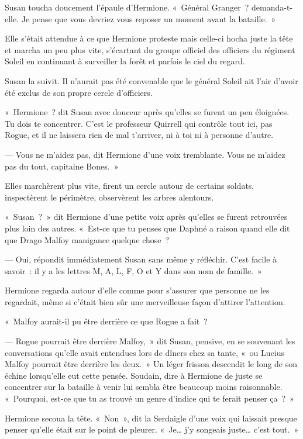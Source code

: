 Susan toucha doucement l'épaule d'Hermione. «~Général Granger~? demanda-t-elle. Je pense que vous devriez vous reposer un moment avant la bataille.~»

Elle s'était attendue à ce que Hermione proteste mais celle-ci hocha juste la tête et marcha un peu plus vite, s'écartant du groupe officiel des officiers du régiment Soleil en continuant à surveiller la forêt et parfois le ciel du regard.

Susan la suivit. Il n'aurait pas été convenable que le général Soleil ait l'air d'avoir été exclus de son propre cercle d'officiers.

«~Hermione~? dit Susan avec douceur après qu'elles se furent un peu éloignées. Tu dois te concentrer. C'est le professeur Quirrell qui contrôle tout ici, pas Rogue, et il ne laissera rien de mal t'arriver, ni à toi ni à personne d'autre.

--- Vous ne m'aidez pas, dit Hermione d'une voix tremblante. Vous ne m'aidez pas du tout, capitaine Bones.~»

Elles marchèrent plus vite, firent un cercle autour de certains soldats, inspectèrent le périmètre, observèrent les arbres alentours.

«~Susan~?~» dit Hermione d'une petite voix après qu'elles se furent retrouvées plus loin des autres. «~Est-ce que tu penses que Daphné a raison quand elle dit que Drago Malfoy manigance quelque chose~?

--- Oui, répondit immédiatement Susan sans même y réfléchir. C'est facile à savoir~: il y a les lettres M, A, L, F, O et Y dans son nom de famille.~»

Hermione regarda autour d'elle comme pour s'assurer que personne ne les regardait, même si c'était bien sûr une merveilleuse façon d'attirer l'attention.

«~Malfoy aurait-il pu être derrière ce que Rogue a fait~?

--- Rogue pourrait être derrière Malfoy,~» dit Susan, pensive, en se souvenant les conversations qu'elle avait entendues lors de dîners chez sa tante, «~ou Lucius Malfoy pourrait être derrière les deux.~» Un léger frisson descendit le long de son échine lorsqu'elle eut cette pensée. Soudain, dire à Hermione de juste se concentrer sur la bataille à venir lui sembla être beaucoup moins raisonnable. «~Pourquoi, est-ce que tu as trouvé un genre d'indice qui te ferait penser ça~?~»

Hermione secoua la tête. «~Non~», dit la Serdaigle d'une voix qui laissait presque penser qu'elle était sur le point de pleurer. «~Je… j'y songeais juste… c'est tout.~»

